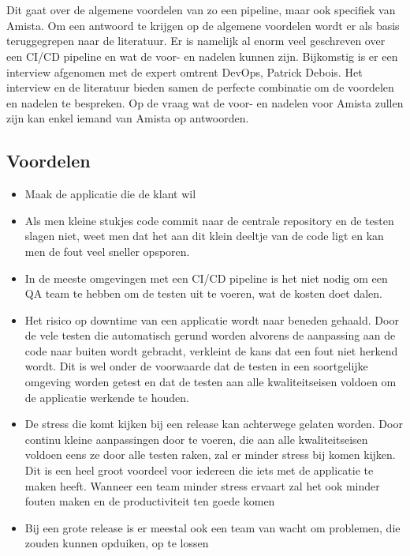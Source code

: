 
\chapter{}
\label{ch:voor-en-nadelen-cicd}
Dit gaat over de algemene voordelen van zo een pipeline, maar ook specifiek van Amista. Om een antwoord te krijgen op de algemene voordelen wordt er als basis teruggegrepen naar de literatuur. Er is namelijk al enorm veel geschreven over een CI/CD pipeline en wat de voor- en nadelen kunnen zijn.
Bijkomstig is er een interview afgenomen met de expert omtrent DevOps, Patrick Debois.
Het interview en de literatuur bieden samen de perfecte combinatie om de voordelen en nadelen te bespreken.
Op de vraag wat de voor- en nadelen voor Amista zullen zijn kan enkel iemand van Amista op antwoorden.


\section{Voordelen}
\label{sec:voordelen}
\begin{itemize}
    \item Maak de applicatie die de klant wil %
    \item Als men kleine stukjes code commit naar de centrale repository en de testen slagen niet, weet men dat het aan dit klein deeltje van de code ligt en kan men de fout veel sneller opsporen. %
    \item In de meeste omgevingen met een CI/CD pipeline is het niet nodig om een QA team te hebben om de testen uit te voeren, wat de kosten doet dalen.
    \item Het risico op downtime van een applicatie wordt naar beneden gehaald. Door de vele testen die automatisch gerund worden alvorens de aanpassing aan de code naar buiten wordt gebracht, verkleint de kans dat een fout niet herkend wordt. Dit is wel onder de voorwaarde dat de testen in een soortgelijke omgeving worden getest en dat de testen aan alle kwaliteitseisen voldoen om de applicatie werkende te houden.
    \item De stress die komt kijken bij een release kan achterwege gelaten worden. Door continu kleine aanpassingen door te voeren, die aan alle kwaliteitseisen voldoen eens ze door alle testen raken, zal er minder stress bij komen kijken. Dit is een heel groot voordeel voor iedereen die iets met de applicatie te maken heeft. Wanneer een team minder stress ervaart zal het ook minder fouten maken en de productiviteit ten goede komen
    \item Bij een grote release is er meestal ook een team van wacht om problemen, die zouden kunnen opduiken, op te lossen
\end{itemize}

